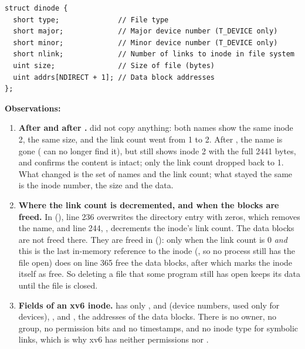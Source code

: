 \documentclass[11pt,a4paper]{article}
\begin{document}
\begin{lstlisting}[style=ccode,firstnumber=32,caption={The on-disk inode, struct dinode in kernel/fs.h}]
struct dinode {
  short type;              // File type
  short major;             // Major device number (T_DEVICE only)
  short minor;             // Minor device number (T_DEVICE only)
  short nlink;             // Number of links to inode in file system
  uint size;               // Size of file (bytes)
  uint addrs[NDIRECT + 1]; // Data block addresses
};
\end{lstlisting}

\textbf{Observations:}
\begin{enumerate}
  \item \textbf{After  and after .}  did not copy
  anything: both names show the same inode 2, the same size, and the link count went from 1
  to 2. After , the name  is gone ( can no longer
  find it), but  still shows inode 2 with the full 2441 bytes, and  confirms
  the content is intact; only the link count dropped back to 1. What changed is the set of
  names and the link count; what stayed the same is the inode number, the size and the data.
  \item \textbf{Where the link count is decremented, and when the blocks are freed.} In
   (), line 236 overwrites the directory entry with
  zeros, which removes the name, and line 244, , decrements the inode's link
  count. The data blocks are not freed there. They are freed in 
  (): only when the link count is 0 \emph{and} this is the last in-memory
  reference to the inode (, so no process still has the file open) does
   on line 365 free the data blocks, after which  marks the inode
  itself as free. So deleting a file that some program still has open keeps its data until the
  file is closed.
  \item \textbf{Fields of an xv6 inode.}  has only ,
   and  (device numbers, used only for devices), ,
   and , the addresses of the data blocks. There is no
  owner, no group, no permission bits and no timestamps, and no inode type for symbolic links,
  which is why xv6 has neither permissions nor .
\end{enumerate}
\end{document}
